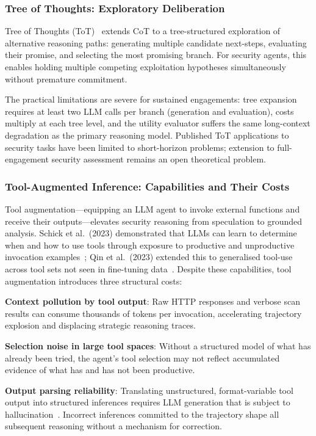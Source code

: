 \documentclass[12pt,a4paper,oneside,openany]{book}
\begin{document}
\subsubsection{Tree of Thoughts: Exploratory Deliberation}
\label{subsubsec:tot}

Tree of Thoughts (ToT)~\citep{yao2023tot} extends CoT to a tree-structured exploration of alternative reasoning paths: generating multiple candidate next-steps, evaluating their promise, and selecting the most promising branch. For security agents, this enables holding multiple competing exploitation hypotheses simultaneously without premature commitment.

The practical limitations are severe for sustained engagements: tree expansion requires at least two LLM calls per branch (generation and evaluation), costs multiply at each tree level, and the utility evaluator suffers the same long-context degradation as the primary reasoning model. Published ToT applications to security tasks have been limited to short-horizon problems; extension to full-engagement security assessment remains an open theoretical problem.


\subsubsection{Tool-Augmented Inference: Capabilities and Their Costs}
\label{subsubsec:tooluse}

Tool augmentation---equipping an LLM agent to invoke external functions and receive their outputs---elevates security reasoning from speculation to grounded analysis. Schick et al.\ (2023) demonstrated that LLMs can learn to determine when and how to use tools through exposure to productive and unproductive invocation examples~\citep{schick2023toolformer}; Qin et al.\ (2023) extended this to generalised tool-use across tool sets not seen in fine-tuning data~\citep{qin2023toolllm}. Despite these capabilities, tool augmentation introduces three structural costs:

\textbf{Context pollution by tool output}: Raw HTTP responses and verbose scan results can consume thousands of tokens per invocation, accelerating trajectory explosion and displacing strategic reasoning traces.

\textbf{Selection noise in large tool spaces}: Without a structured model of what has already been tried, the agent's tool selection may not reflect accumulated evidence of what has and has not been productive.

\textbf{Output parsing reliability}: Translating unstructured, format-variable tool output into structured inferences requires LLM generation that is subject to hallucination~\citep{ji2023survey}. Incorrect inferences committed to the trajectory shape all subsequent reasoning without a mechanism for correction.
\end{document}
